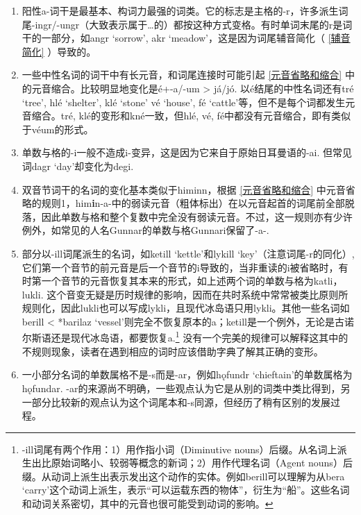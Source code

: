 \begin{enumerate}
  \item
        阳性a-词干是最基本、构词力最强的词类。它的标志是主格的-r，许多派生词尾-ingr/-ungr（大致表示属于\ldots 的）都按这种方式变格。有时单词末尾的r是词干的一部分，如angr
        `sorrow', akr
        `meadow'，这是因为词尾辅音简化（ \ref{辅音简化} ）导致的。
  \item
        一些中性名词的词干中有长元音，和词尾连接时可能引起 \ref{元音省略和缩合} 中的元音缩合。比较明显地变化是é+-a/-um
        > já/jó. 以é结尾的中性名词还有tré `tree', hlé `shelter',
        klé `stone' vé `house', fé
        `cattle'等，但不是每个词都发生元音缩合。tré,
        klé的变形和kné一致，但hlé, vé,
        fé中都没有元音缩合，即有类似于véum的形式。
  \item
        单数与格的-i一般不造成i-变异，这是因为它来自于原始日耳曼语的-ai. 但常见词dagr `day'却变化为degi.
  \item
        双音节词干的名词的变化基本类似于himinn，根据 \ref{元音省略和缩合} 中元音省略的规则1，him\textbf{i}n-a-中的弱读元音（粗体标出）在以元音起首的词尾前全部脱落，因此单数与格和整个复数中完全没有弱读元音。不过，这一规则亦有少许例外，如常见的人名Gunnar的单数与格Gunnari保留了-a-.
  \item
        部分以-ill词尾派生的名词，如ketill `kettle'和lykill
        `key'（注意词尾-r的同化）,
        它们第一个音节的前元音是后一个音节的i导致的，当非重读的i被省略时，有时第一个音节的元音恢复其本来的形式，如上述两个词的单数与格为katli，lukli.
        这个音变无疑是历时规律的影响，因而在共时系统中常常被类比原则所规则化，因此lukli也可以写成lykli，且现代冰岛语只用lykli。其他一些名词如berill
        < *barilaz
        `vessel'则完全不恢复原本的a；ketill是一个例外，无论是古诺尔斯语还是现代冰岛语，都要恢复a.\footnote{-ill词尾有两个作用：1）用作指小词（Diminutive
          nouns）后缀。从名词上派生出比原始词略小、较弱等概念的新词；2）用作代理名词（Agent
          nouns）后缀。从动词上派生出表示发出这个动作的实体。例如berill可以理解为从bera
          `carry'这个动词上派生，表示``可以运载东西的物体''，衍生为``船''。这些名词和动词关系密切，其中的元音也很可能受到动词的影响。}
        没有一个完美的规律可以解释这其中的不规则现象，读者在遇到相应的词时应该借助字典了解其正确的变形。
  \item
        一小部分名词的单数属格不是-s而是-ar，例如hǫfundr
        `chieftain'的单数属格为hǫfundar.
        -ar的来源尚不明确，一些观点认为它是从别的词类中类比得到，另一部分比较新的观点认为这个词尾本和-s同源，但经历了稍有区别的发展过程。
\end{enumerate}

